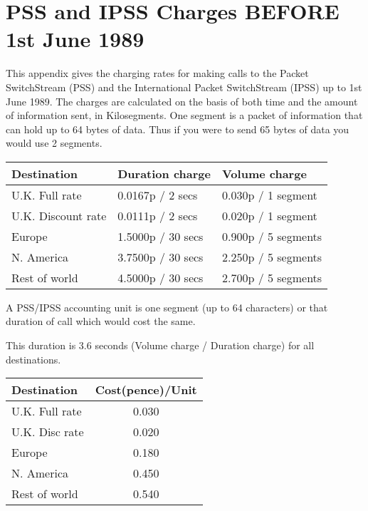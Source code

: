 \appendix 

\section{PSS and IPSS Charges BEFORE 1st June 1989}

This appendix gives the charging  rates  for  making  calls  to  the Packet
SwitchStream  (PSS) and the International Packet SwitchStream (IPSS) up to
1st June 1989. The charges are calculated on the basis of  both  time  and
the amount  of  information sent, in Kilosegments.  One segment is a packet
of information that can hold up to 64 bytes of data.  Thus if you were to
send 65 bytes of data you would use 2 segments. 
 
\begin{table}[h]
\begin{center}
\begin{tabular} {||l|l|l||}
\hline
Destination  &  Duration charge   & Volume charge \\
\hline
U.K. Full rate      &    0.0167p /  2 secs   &    0.030p / 1 segment \\
U.K. Discount rate  &    0.0111p /  2 secs   &    0.020p / 1 segment   \\
Europe              &    1.5000p / 30 secs   &    0.900p / 5 segments  \\
N. America          &    3.7500p / 30 secs   &    2.250p / 5 segments  \\
Rest of world       &    4.5000p / 30 secs   &    2.700p / 5 segments  \\
\hline
\end{tabular}
\end{center} 
\end{table}

  A PSS/IPSS accounting unit is one segment (up to 64  characters)  or
  that duration of call which would cost the same.
 
  This duration is 3.6 seconds (Volume charge / Duration  charge)  for
  all destinations.
 
\begin{table}[h]
\begin{center}
\begin{tabular} {||l|c||}
\hline
Destination   &  Cost(pence)/Unit \\
\hline 
U.K. Full rate       &    0.030 \\
U.K. Disc rate       &    0.020 \\
Europe               &    0.180 \\
N. America           &    0.450 \\
Rest of world        &    0.540 \\
\hline
\end{tabular}
\end{center} 
\end{table}

